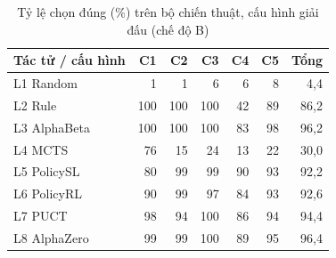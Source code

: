\begin{table}[H]
  \centering
  \small
  \caption{Tỷ lệ chọn đúng (\%) trên bộ chiến thuật, cấu hình giải đấu (chế độ B)}
  \label{tab:cs-ct-goc}
  \begin{tabular}{lrrrrrr}
    \toprule
    Tác tử / cấu hình & C1 & C2 & C3 & C4 & C5 & Tổng \\
    \midrule
    L1 Random & 1 & 1 & 6 & 6 & 8 & 4,4 \\
    L2 Rule & 100 & 100 & 100 & 42 & 89 & 86,2 \\
    L3 AlphaBeta & 100 & 100 & 100 & 83 & 98 & 96,2 \\
    L4 MCTS & 76 & 15 & 24 & 13 & 22 & 30,0 \\
    L5 PolicySL & 80 & 99 & 99 & 90 & 93 & 92,2 \\
    L6 PolicyRL & 90 & 99 & 97 & 84 & 93 & 92,6 \\
    L7 PUCT & 98 & 94 & 100 & 86 & 94 & 94,4 \\
    L8 AlphaZero & 99 & 99 & 100 & 89 & 95 & 96,4 \\
    \bottomrule
  \end{tabular}
\end{table}
